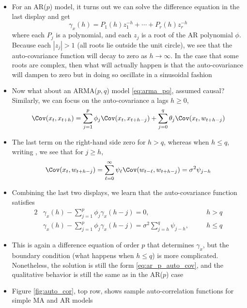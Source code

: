 \documentclass{article}
\begin{document}
\begin{itemize}
\item For an AR($p$) model, it turns out we can solve the difference equation in
  the 
  last display and get
  \begin{equation}
  \label{eq:ar_p_auto_cov}
  \gamma_x(h) = P_1(h) z_1^{-h} + \cdots + P_r(h) z_r^{-h}
  \end{equation}
  where each $P_j$ is a polynomial, and each $z_j$ is a root of the AR
  polynomial $\phi$. Because each $|z_j| > 1$ (all roots lie outside the unit
  circle), we see that the auto-covariance function will decay to zero as $h \to
  \infty$. In the case that some roots are complex, then what will actually 
  happen is that the auto-covariance will dampen to zero but in doing so
  oscillate in a sinusoidal fashion

\item Now what about an ARMA($p,q$) model \eqref{eq:arma_pq}, assumed
  causal? Similarly, we can focus on the auto-covariance a lags $h \geq 0$, 
  \[
  \Cov(x_t, x_{t+h}) = \sum_{j=1}^p \phi_j \Cov(x_t, x_{t+h-j}) + \sum_{j=0}^q 
  \theta_j \Cov(x_t, w_{t+h-j})  
  \]

\item The last term on the right-hand side zero for $h>q$, whereas when $h \leq
  q$, writing , we see
  that for $j \geq h$, 
  \[
  \Cov(x_t, w_{t+h-j}) = \sum_{\ell=0}^\infty \psi_\ell \Cov(w_{t-\ell},
  w_{t+h-j}) = \sigma^2 \psi_{j-h}   
  \]

\item Combining the last two displays, we learn that the auto-covariance
  function satisfies 
  \begin{alignat*}{2}
  &\gamma_x(h) - \sum_{j=1}^p \phi_j \gamma_x(h-j) = 0, \quad &&h > q \\ 
  &\gamma_x(h) - \sum_{j=1}^p \phi_j \gamma_x(h-j) = \sigma^2 \sum_{j=h}^q
    \psi_{j-h}, \quad &&h \leq q
  \end{alignat*}

\item This is again a difference equation of order $p$ that determines
  $\gamma_x$, but the boundary condition (what happens when $h \leq q$) is more
  complicated. Nonetheless, the solution is still the form
  \eqref{eq:ar_p_auto_cov}, and the qualitative behavior is still the same as in 
  the AR($p$) case   

\item Figure \ref{fig:auto_cor}, top row, shows sample auto-correlation
  functions for simple MA and AR models 


\end{itemize}
\end{document}
